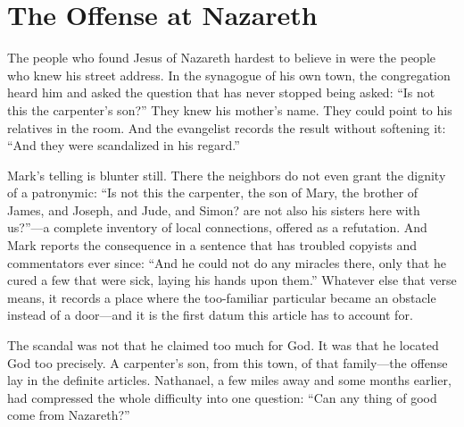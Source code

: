 \section{The Offense at Nazareth}

The people who found Jesus of Nazareth hardest to believe in were the people who knew his street address. In the synagogue of his own town, the congregation heard him and asked the question that has never stopped being asked: ``Is not this the carpenter's son?'' They knew his mother's name. They could point to his relatives in the room. And the evangelist records the result without softening it: ``And they were scandalized in his regard.''

Mark's telling is blunter still. There the neighbors do not even grant the dignity of a patronymic: ``Is not this the carpenter, the son of Mary, the brother of James, and Joseph, and Jude, and Simon? are not also his sisters here with us?''---a complete inventory of local connections, offered as a refutation. And Mark reports the consequence in a sentence that has troubled copyists and commentators ever since: ``And he could not do any miracles there, only that he cured a few that were sick, laying his hands upon them.'' Whatever else that verse means, it records a place where the too-familiar particular became an obstacle instead of a door---and it is the first datum this article has to account for.

The scandal was not that he claimed too much for God. It was that he located God too precisely. A carpenter's son, from this town, of that family---the offense lay in the definite articles. Nathanael, a few miles away and some months earlier, had compressed the whole difficulty into one question: ``Can any thing of good come from Nazareth?''\,

